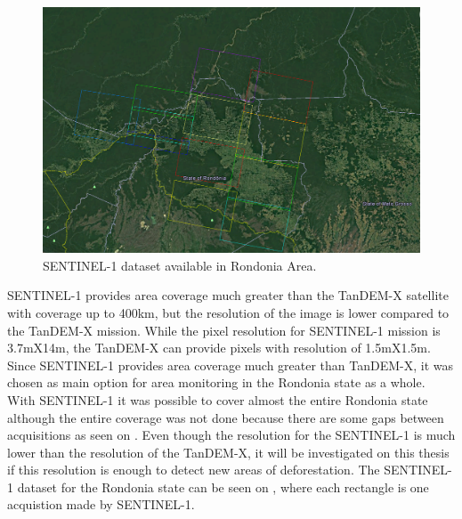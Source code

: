 \begin{figure}[H]
    \centering
    \includegraphics[width=\linewidth]{Chapter2-real/sentinel_dataset.png}
    \caption{SENTINEL-1 dataset available in Rondonia Area.}
    \label{fig:sentinel_dataset}
\end{figure}{}

SENTINEL-1 provides area coverage much greater than the TanDEM-X satellite with coverage up to 400km, but the resolution of the image is lower compared to the TanDEM-X mission. While the pixel resolution for SENTINEL-1 mission is 3.7mX14m, the TanDEM-X can provide pixels with resolution of 1.5mX1.5m. Since SENTINEL-1 provides area coverage much greater than TanDEM-X, it was chosen as main option for area monitoring in the Rondonia state as a whole. With SENTINEL-1 it was possible to cover almost the entire Rondonia state although the entire coverage was not done because there are some gaps between acquisitions as seen on . Even though the resolution for the SENTINEL-1 is much lower than the resolution of the TanDEM-X, it will be investigated on this thesis if this resolution is enough to detect new areas of deforestation. The SENTINEL-1 dataset for the Rondonia state can be seen on , where each rectangle is one acquistion made by SENTINEL-1.